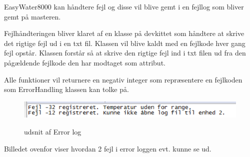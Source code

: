 
EasyWater8000 kan håndtere fejl og disse vil blive gemt i en fejllog som bliver gemt på masteren. 

Fejlhåndteringen bliver klaret af en klasse på devkittet som håndtere at skrive det rigtige fejl ud i en txt fil. Klassen vil blive kaldt med en fejlkode hver gang fejl opstår. Klassen forstår så at skrive den rigtige fejl ind i txt filen ud fra den pågældende fejlkode den har modtaget som attribut. 

Alle funktioner vil returnere en negativ integer som repræsentere en fejlkoden som ErrorHandling klassen kan tolke på.

\begin{figure}[htbp] \centering
{\includegraphics[scale=0.7]{filer/pics/Errortxt}}
\caption{udsnit af Error log}
\label{fig:ErrorLog}
\end{figure}

Billedet ovenfor viser hvordan 2 fejl i error loggen evt. kunne se ud.